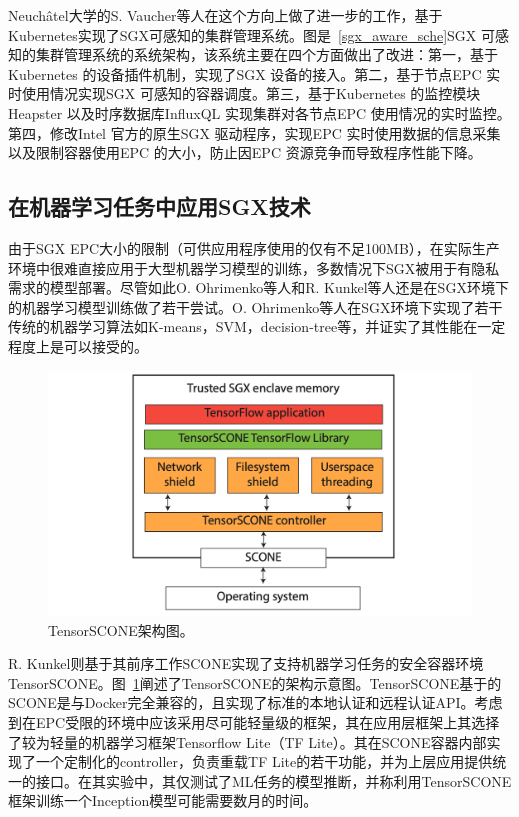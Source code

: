Neuchâtel大学的S. Vaucher等人\parencite{vaucher2018sgx}在这个方向上做了进一步的工作，基于Kubernetes实现了SGX可感知的集群管理系统。图是~\ref{sgx_aware_sche}SGX 可感知的集群管理系统的系统架构，该系统主要在四个方面做出了改进：第一，基于Kubernetes 的设备插件机制，实现了SGX 设备的接入。第二，基于节点EPC 实时使用情况实现SGX 可感知的容器调度。第三，基于Kubernetes 的监控模块Heapster 以及时序数据库InfluxQL 实现集群对各节点EPC 使用情况的实时监控。第四，修改Intel 官方的原生SGX 驱动程序，实现EPC 实时使用数据的信息采集以及限制容器使用EPC 的大小，防止因EPC 资源竞争而导致程序性能下降。

\subsection{在机器学习任务中应用SGX技术}
由于SGX EPC大小的限制（可供应用程序使用的仅有不足100MB），在实际生产环境中很难直接应用于大型机器学习模型的训练，多数情况下SGX被用于有隐私需求的模型部署。尽管如此O. Ohrimenko等人\parencite{197247}和R. Kunkel\parencite{kunkel2019tensorscone}等人还是在SGX环境下的机器学习模型训练做了若干尝试。O. Ohrimenko等人在SGX环境下实现了若干传统的机器学习算法如K-means，SVM，decision-tree等，并证实了其性能在一定程度上是可以接受的。

\begin{figure}[h]
    \centerline{\includegraphics[width=\textwidth]{figures/tensorscone-arch.png}}
    \caption{TensorSCONE架构图。}
    \label{tensorscone_arch}
\end{figure}

R. Kunkel则基于其前序工作SCONE\parencite{arnautov2016scone}实现了支持机器学习任务的安全容器环境TensorSCONE。图~\ref{tensorscone_arch}阐述了TensorSCONE的架构示意图。TensorSCONE基于的SCONE是与Docker完全兼容的，且实现了标准的本地认证和远程认证API。考虑到在EPC受限的环境中应该采用尽可能轻量级的框架，其在应用层框架上其选择了较为轻量的机器学习框架Tensorflow Lite（TF Lite）。其在SCONE容器内部实现了一个定制化的controller，负责重载TF Lite的若干功能，并为上层应用提供统一的接口。在其实验中，其仅测试了ML任务的模型推断，并称利用TensorSCONE框架训练一个Inception模型可能需要数月的时间。

